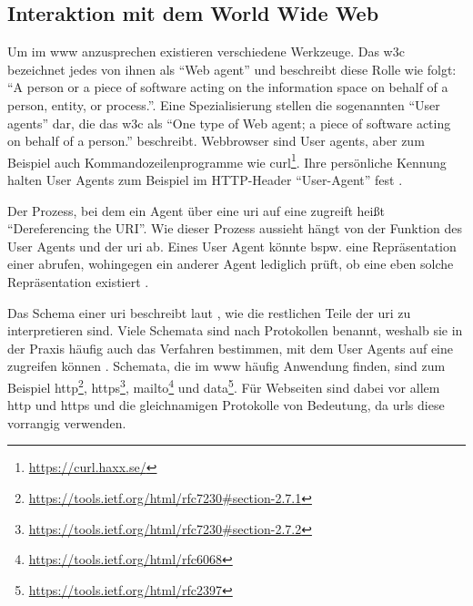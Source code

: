     \subsection{Interaktion mit dem World Wide Web}
        Um {\resources} im \gls{www} anzusprechen existieren verschiedene Werkzeuge.
        Das \gls{w3c} \cite[Kapitel 6]{w3c:wwwArch} bezeichnet jedes von ihnen als
        "`Web agent"' und beschreibt diese Rolle wie folgt:
        "`A person or a piece of software acting on the information
        space on behalf of a person, entity, or process."'.
        Eine Spezialisierung stellen die sogenannten "`User agents"' dar,
        die das \gls{w3c} \cite[Kapitel 6]{w3c:wwwArch} als "`One type of Web agent;
        a piece of software acting on behalf of a person."' beschreibt.
        Webbrowser sind User agents, aber zum Beispiel auch Kommandozeilenprogramme
        wie curl\footnote{\url{https://curl.haxx.se/}}.
        Ihre persönliche Kennung halten User Agents zum Beispiel im
        HTTP-Header "`User-Agent"' fest \cite[Kapitel 5.5.3, Seite 46]{rfc:7231}.

        Der Prozess, bei dem ein Agent über eine \gls{uri} auf eine {\resource}
        zugreift heißt "`Dereferencing the URI"'.
        Wie dieser Prozess aussieht hängt von der Funktion des User Agents und der \gls{uri} ab.
        Eines User Agent könnte bspw. eine
        Repräsentation einer {\resource} abrufen, wohingegen ein anderer Agent
        lediglich prüft, ob eine eben solche Repräsentation existiert
        \cite[Kapitel 3.1]{w3c:wwwArch}.

        Das Schema einer \gls{uri} beschreibt laut \cite[Kapitel 3.1]{rfc:3986},
        wie die restlichen Teile der \gls{uri} zu interpretieren sind.
        Viele Schemata sind nach Protokollen benannt,
        weshalb sie in der Praxis häufig auch das Verfahren bestimmen,
        mit dem User Agents auf eine {\resource} zugreifen können
        \cite[Kapitel 3.1]{w3c:wwwArch}.
        Schemata, die im \gls{www} häufig Anwendung finden,
        sind zum Beispiel
        http\footnote{\url{https://tools.ietf.org/html/rfc7230\#section-2.7.1}},
        https\footnote{\url{https://tools.ietf.org/html/rfc7230\#section-2.7.2}},
        mailto\footnote{\url{https://tools.ietf.org/html/rfc6068}} und
        data\footnote{\url{https://tools.ietf.org/html/rfc2397}}.
        Für Webseiten sind dabei vor allem http und https
        und die gleichnamigen Protokolle von Bedeutung,
        da \glspl{url} diese vorrangig verwenden.


